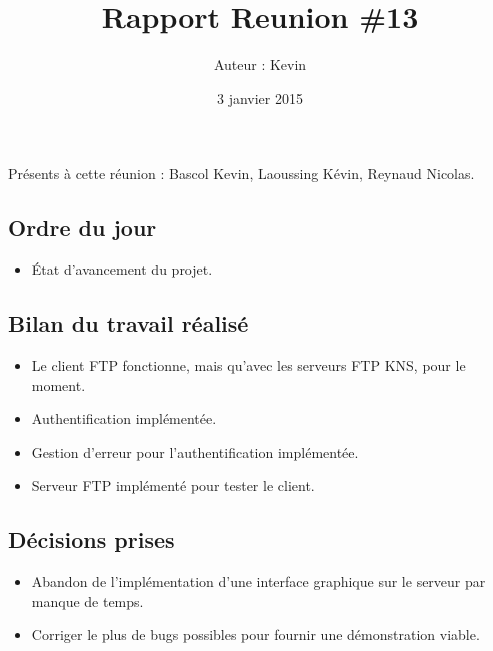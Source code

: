 \documentclass[12pt,a4paper]{article}
\title{Rapport Reunion \#13}
\author{Auteur : Kevin \bsc{BASCOL}}
\date{3 janvier 2015}
\begin{document}
\maketitle

\newpage

Présents à cette réunion : Bascol Kevin, Laoussing Kévin, Reynaud Nicolas.

\subsection*{Ordre du jour}
\begin{itemize}[label = $\blacktriangleright$]
\item État d'avancement du projet.
\end{itemize}

\subsection*{Bilan du travail réalisé}

\begin{itemize}[label = $\blacktriangleright$]
\item Le client FTP fonctionne, mais qu'avec les serveurs FTP KNS, pour le moment.

\item Authentification implémentée. 

\item Gestion d'erreur pour l'authentification implémentée.

\item Serveur FTP implémenté pour tester le client.
\end{itemize}


\subsection*{Décisions prises}

\begin{itemize}[label = $\blacktriangleright$] 
\item Abandon de l'implémentation d'une interface graphique sur le serveur par manque de temps.

\item Corriger le plus de bugs possibles pour fournir une démonstration viable.
\end{itemize}
\end{document}
